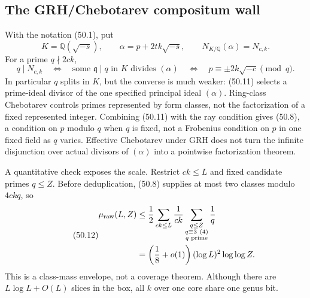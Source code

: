\documentclass[10pt,reqno]{amsart}
\theoremstyle{definition}
\newcommand{\1}{\mathbf 1}
\begin{document}
\subsection{The GRH/Chebotarev compositum wall}
With the notation (50.1), put
\begin{equation}\tag{50.10}
 K=\mathbb Q(\sqrt{-s}),\qquad
 \alpha=p+2tk\sqrt{-s},\qquad
 N_{K/\mathbb Q}(\alpha)=N_{c,k}.
\end{equation}
For a prime $q\nmid2ck$,
\begin{equation}\tag{50.11}
 q\mid N_{c,k}
 \quad\Longleftrightarrow\quad
 \text{some }\mathfrak q\mid q\text{ in }K\text{ divides }(\alpha)
 \quad\Longleftrightarrow\quad
 p\equiv\pm2k\sqrt{-c}\pmod q.
\end{equation}
In particular $q$ splits in $K$, but the converse is much weaker: (50.11)
selects a prime-ideal divisor of the one specified principal ideal
$(\alpha)$.  Ring-class Chebotarev controls primes represented by form
classes, not the factorization of a fixed represented integer.  Combining
(50.11) with the ray condition gives (50.8), a condition on $p$ modulo $q$
when $q$ is fixed, not a Frobenius condition on $p$ in one fixed field as
$q$ varies.  Effective Chebotarev under GRH does not turn the infinite
disjunction over actual divisors of $(\alpha)$ into a pointwise
factorization theorem.

A quantitative check exposes the scale.  Restrict $ck\leq L$ and fixed
candidate primes $q\leq Z$.  Before deduplication, (50.8) supplies at most
two classes modulo $4ckq$, so
\begin{equation}\tag{50.12}
 \begin{split}
 \mu_{\rm raw}(L,Z)
 &\leq\frac12\sum_{ck\leq L}\frac1{ck}
       \sum_{\substack{q\leq Z\\q\equiv3\ (4)\\q\text{ prime}}}\frac1q\\
 &=\left(\frac18+o(1)\right)(\log L)^2\log\log Z.
 \end{split}
\end{equation}
This is a class-mass envelope, not a coverage theorem.  Although there are
$L\log L+O(L)$ slices in the box, all $k$ over one core share one genus bit.
\end{document}
